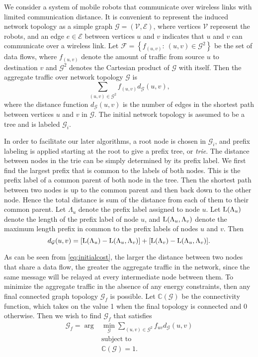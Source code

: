 \documentclass[10pt,conference]{IEEEtran}
\begin{document}
We consider a system of mobile robots that communicate over wireless
links with limited communication distance.  It is convenient to
represent the induced network topology as a simple graph $\mathcal{G} =
(\mathcal{V},\mathcal{E})$, where vertices $\mathcal{V}$ represent the
robots, and an edge $e \in \mathcal{E}$ between vertices $u$ and $v$
indicates that $u$ and $v$ can communicate over a wireless link.  Let
$\mathcal{F}=\left\{ f_{(u,v)}: ~ (u,v) \in \mathcal{G}^2 \right\}$ be
the set of data flows, where $f_{(u,v)}$ denote the amount of traffic
from source $u$ to destination $v$ and $\mathcal{G}^2$ denotes the
Cartesian product of $\mathcal{G}$ with itself.  Then the aggregate
traffic over network topology $\mathcal{G}$ is
\begin{equation}
\label{eq:initialcost}\sum_{(u,v) \in
  \mathcal{G}^2}f_{(u,v)}d_{\mathcal{G}}(u,v),
\end{equation}
where the distance function $d_{\mathcal{G}}(u,v)$ is the number of
edges in the shortest path between vertices $u$ and $v$ in
$\mathcal{G}$.  The initial network topology is assumed to be a tree
and is labeled $\mathcal{G}_{i}$.


In order to facilitate our later algorithms, a root node is chosen in
$\mathcal{G}_i$, and prefix labeling is applied starting at the root
to give a prefix tree, or {\it trie}.  The distance between nodes in
the trie can be simply determined by its prefix label. We first find
the largest prefix that is common to the labels of both nodes.  This
is the prefix label of a common parent of both node in the tree.  Then
the shortest path between two nodes is up to the common parent and
then back down to the other node. Hence the total distance is sum of
the distance from each of them to their common parent.  Let
$\Lambda_u$ denote the prefix label assigned to node $u$.  Let
$\operatorname{L}(\Lambda_u)$ denote the length of the prefix label of node $u$, and
$\operatorname{L}(\Lambda_u,\Lambda_v)$ denote the maximum length prefix in common
to the prefix labels of nodes $u$ and $v$.  Then
\begin{equation}
\label{eq:distance_1} d_{\mathcal{G}}(u,v) = [\operatorname{L}(\Lambda_{u}) -
\operatorname{L}(\Lambda_{u},\Lambda_{v})] + [\operatorname{L}(\Lambda_{v}) -
\operatorname{L}(\Lambda_{u},\Lambda_{v})].
\end{equation}


As can be seen from \eqref{eq:initialcost}, the larger the distance
between two nodes that share a data flow, the greater the aggregate
traffic in the network, since the same message will be relayed at
every intermediate node between them.  To minimize the aggregate
traffic in the absence of any energy constraints, then any final connected graph
topology $\mathcal{G}_f$ is possible.  Let $\mathbb{C}(\mathcal{G})$
be the connectivity function, which takes on the value 1 when the
final topology is connected and 0 otherwise.  Then
we wish to find $\mathcal{G}_{f}$ that satisfies
\begin{align}
\label{eq:min} \mathcal{G}_f = \arg & \min_{\mathcal{G}}
\sum_{(u,v) \in \mathcal{G}^2} f_{uv} d_{\mathcal{G}}(u,v)\\
& \mbox{subject to} \nonumber \\
& \mathbb{C}(\mathcal{G})=1. \nonumber
\end{align}
\end{document}
